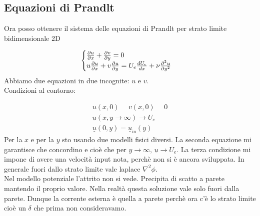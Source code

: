 \subsection{Equazioni di Prandlt}

Ora posso ottenere il sistema delle equazioni di Prandlt per strato limite bidimensionale 2D

\begin{equation}
	\label{eq:prandlt}
  \begin{cases}
    \frac{\partial u}{\partial x}+\frac{\partial v}{\partial y}=0\\
    u \frac{\partial u}{\partial x}+v\frac{\partial u}{\partial y}= U_e \frac{dU_e}{dx} + \nu \frac{\partial^2u}{\partial y^2}
  \end{cases}
\end{equation}
Abbiamo due equazioni in due incognite: $ u $ e $ v $.\\
Condizioni al contorno:

\begin{gather*} 
  u\left( x,0\right) =v\left( x,0\right) =0 \\
  \underline{u}\left( x,y\rightarrow \infty \right) \rightarrow U_e\\
  \underline{u}\left( 0,y\right)  = \underline{u}_{\text{in}}\left( y\right) 
\end{gather*}
Per la $ x $ e per la $ y $ sto usando due modelli fisici diversi. La seconda equazione mi garantisce che concordino e cioè che per $ y\to\infty, \, \underline{u}\to U_e$.
La terza condizione mi impone di avere una velocità input nota, perchè non si è ancora sviluppata. In generale fuori dallo strato limite vale laplace $ \nabla^2\phi  $.\\
\hline
\vspace{2ex}
Nel modello potenziale l'attrito non si vede.
Precipita di scatto a parete mantendo il proprio valore.
Nella realtà questa soluzione vale solo fuori dalla parete.
Dunque la corrente esterna è quella a parete perchè ora c'è lo strato limite cioè un $ \delta  $ che prima non consideravamo.

